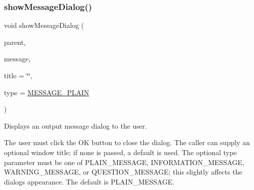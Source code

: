 \subsubsection{\texorpdfstring{show\+Message\+Dialog()}{showMessageDialog()}\hspace{0.1cm}{\footnotesize\ttfamily [2/3]}}
{\footnotesize\ttfamily void show\+Message\+Dialog (\begin{DoxyParamCaption}\item[{\mbox{\hyperlink{classsgl_1_1GWindow}{G\+Window}} $\ast$}]{parent,  }\item[{const std\+::string \&}]{message,  }\item[{const std\+::string \&}]{title = {\ttfamily \char`\"{}\char`\"{}},  }\item[{\mbox{\hyperlink{classsgl_1_1GOptionPane_ac6606ebe91c8ac66a2c314c79f5ab013}{Message\+Type}}}]{type = {\ttfamily \mbox{\hyperlink{classsgl_1_1GOptionPane_ac6606ebe91c8ac66a2c314c79f5ab013ac03a17c74c589b004d166532958a6196}{M\+E\+S\+S\+A\+G\+E\+\_\+\+P\+L\+A\+IN}}} }\end{DoxyParamCaption})\hspace{0.3cm}{\ttfamily [static]}}



Displays an output message dialog to the user. 

The user must click the \textquotesingle{}OK\textquotesingle{} button to close the dialog. The caller can supply an optional window title; if none is passed, a default is used. The optional \textquotesingle{}type\textquotesingle{} parameter must be one of P\+L\+A\+I\+N\+\_\+\+M\+E\+S\+S\+A\+GE, I\+N\+F\+O\+R\+M\+A\+T\+I\+O\+N\+\_\+\+M\+E\+S\+S\+A\+GE, W\+A\+R\+N\+I\+N\+G\+\_\+\+M\+E\+S\+S\+A\+GE, or Q\+U\+E\+S\+T\+I\+O\+N\+\_\+\+M\+E\+S\+S\+A\+GE; this slightly affects the dialog\textquotesingle{}s appearance. The default is P\+L\+A\+I\+N\+\_\+\+M\+E\+S\+S\+A\+GE. \mbox{\label{classsgl_1_1GOptionPane_a2284af6ada78d0ddedfc5c2eaeea2d9b}} 
